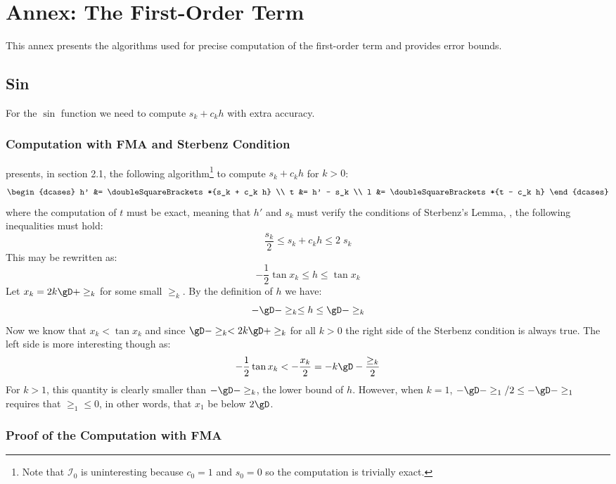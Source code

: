 \documentclass[10pt, a4paper, twoside]{basestyle}
\newcommand{\round}[1]{\doubleSquareBrackets*{#1}}
\begin{document}
\section*{Annex: The First-Order Term}\label{firstorder}

This annex presents the algorithms used for precise computation of the first-order term and provides error bounds.

\subsection*{Sin}

For the $\sin$ function we need to compute $s_k + c_k h$ with extra accuracy.

\subsubsection*{Computation with FMA and Sterbenz Condition}\label{fmasin}

\cite{StehléZimmermann2005} presents, in section 2.1, the following algorithm\footnote{Note that $\mathscr{I}_0$ is uninteresting because $c_0 = 1$ and $s_0 = 0$ so the computation is trivially exact.} to compute $s_k + c_k h$ for $k > 0$:
\[
\begin{dcases}
h' &= \round{s_k + c_k h} \\
t &= h' - s_k \\
l &= \round{t - c_k h}
\end{dcases}
\]
where the computation of $t$ must be exact, meaning that $h'$ and $s_k$ must verify the conditions of Sterbenz's Lemma, \idest, the following inequalities must hold:
\[
\frac{s_k}{2} \le s_k + c_k h \le 2 \; s_k
\]
This may be rewritten as:
\[
-\frac{1}{2} \tan x_k \le h \le \tan x_k
\]
Let $x_k = 2 k \gD + \ge_k$ for some small $\ge_k$.  By the definition of $h$ we have:
\[
-\gD - \ge_k \le h \le \gD - \ge_k
\]
Now we know that $x_k < \tan x_k$ and since $\gD - \ge_k < 2 k \gD + \ge_k$ for all $k > 0$ the right side of the Sterbenz condition is always true.  The left side is more interesting though as:
\[
-\frac{1}{2} \tan x_k < -\frac{x_k}{2} = -k \gD - \frac{\ge_k}{2}
\]
For $k > 1$, this quantity is clearly smaller than $-\gD - \ge_k$, the lower bound of $h$.  However, when $k = 1$, $-\gD - \ge_1 / 2 \le -\gD - \ge_1$ requires that $\ge_1 \le 0$, in other words, that $x_1$ be below $2 \gD$.

\subsubsection*{Proof of the Computation with FMA}\label{prooffmasin}
\end{document}
